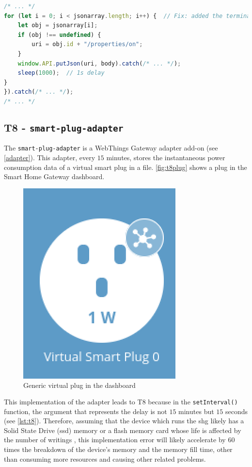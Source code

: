 \begin{lstlisting}[language=JavaScript, label=lst:t7fix, caption=T7 - Fixed loop]
/* ... */
for (let i = 0; i < jsonarray.length; i++) {  // Fix: added the termination condition
    let obj = jsonarray[i];          
    if (obj !== undefined) {
        uri = obj.id + "/properties/on";
    }
    window.API.putJson(uri, body).catch(/* ... */);
    sleep(1000);  // 1s delay
}
}).catch(/* ... */);
/* ... */
\end{lstlisting}



\subsection{T8 - \texttt{smart-plug-adapter}}
\label{t8poc}

The \texttt{smart-plug-adapter} is a WebThings Gateway adapter add-on (see \autoref{adapter}). This adapter, every $15$ minutes, stores the instantaneous power consumption data of a virtual smart plug in a file. \autoref{fig:t8plug} shows a plug in the Smart Home Gateway dashboard.

\begin{figure}[H]
    \centering
    \includegraphics[scale=0.75]{images/addons/simple-plug.png}
    \caption{Generic virtual plug in the dashboard}
    \label{fig:t8plug}
\end{figure}

This implementation of the adapter leads to T8 because in the \texttt{setInterval()} function, the argument that represents the delay is not $15$ minutes but $15$ seconds (see \autoref{lst:t8}). Therefore, assuming that the device which runs the \gls{shg} likely has a Solid State Drive (\gls{ssd}) memory \cite{micheloni2013inside} or a flash memory card whose life is affected by the number of writings \cite{li2019survey}, this implementation error will likely accelerate by $60$ times the breakdown of the device's memory and the memory fill time, other than consuming more resources and causing other related problems.

